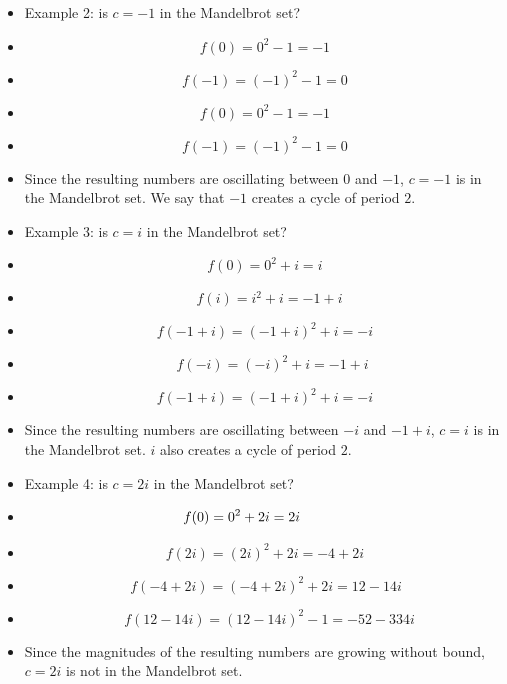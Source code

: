 \documentclass{beamer}
\begin{document}
\frame
{
\begin{itemize}
\item <1->Example 2: is $c=-1$ in the Mandelbrot set?
\item <2-> $$
f(0) = 0^2 - 1 = -1
$$ \vspace*{-32pt}
\item <3-> $$
f(-1) = (-1)^2 - 1 = 0 
$$ \vspace*{-32pt}
\item <4-> $$
f(0) = 0^2 - 1 = -1
$$ \vspace*{-32pt}
\item <5-> $$
f(-1) = (-1)^2 - 1 = 0 
$$
\item <6-> Since the resulting numbers are oscillating between $0$ and $-1$, $c=-1$ is in the Mandelbrot set. We say that $-1$ creates a cycle of period $2$.
\end{itemize}
}

\frame 
{
\begin{itemize}
\item <1->Example 3: is $c=i$ in the Mandelbrot set?
\item <2-> $$ \!\!\!\!\!\!\!\!\!
f(0) = 0^2 + i = i
$$ \vspace*{-32pt}
\item <3-> $$ \ \ \ 
f(i) = i^2 + i = -1+i 
$$ \vspace*{-32pt}
\item <4-> $$
f(-1 + i) = (-1 + i)^2 + i = -i
$$ \vspace*{-32pt}
\item <5-> $$\ \ \ \ \ 
f(-i) = (-i)^2 + i = -1 + i
$$ \vspace*{-32pt}
\item <6-> $$
f(-1 + i) = (-1 + i)^2 + i = -i
$$
\item <6-> Since the resulting numbers are oscillating between $-i$ and $-1 + i$, $c=i$ is in the Mandelbrot set. $i$ also creates a cycle of period $2$.
\end{itemize}
}

\frame
{
\begin{itemize}
\item <1->Example 4: is $c=2i$ in the Mandelbrot set?
\item <2-> $$\mkern-36mu \mkern-18mu \!\!
f(0) = 0^2 + 2i = 2i
$$ \vspace*{-32pt}
\item <3-> $$
f(2i) = (2i)^2 + 2i = -4 + 2i
$$ \vspace*{-32pt}
\item <4-> $$\,
f(-4 + 2i) = (-4 + 2i)^2 + 2i = 12 - 14i
$$ \vspace*{-32pt}
\item <5-> $$\ \ \ 
f(12 - 14i) = (12 - 14i)^2 - 1 = -52 - 334i 
$$
\item <6-> Since the magnitudes of the resulting numbers are growing without bound, $c=2i$ is not in the Mandelbrot set.
\end{itemize}
}
\end{document}
